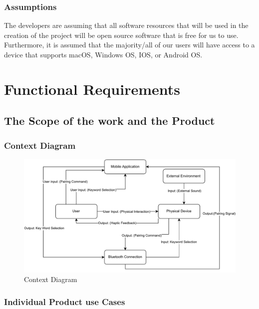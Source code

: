 \documentclass[12pt]{article}
\begin{document}
\subsubsection{Assumptions}
The developers are assuming that all software resources that will be used in the 
creation of the project will be open source software that is free for us to use. 
Furthermore, it is assumed that the majority/all of our users will have access to 
a device that supports macOS, Windows OS, IOS, or Android OS.

\section{Functional Requirements}
\subsection{The Scope of the work and the Product}
\subsubsection{Context Diagram}

\begin{figure}[H]
  \begin{center}
    \includegraphics{WC.pdf}
  \caption{Context Diagram}
  \label{ContextDiagram} 
  \end{center}
\end{figure}

\subsubsection{Individual Product use Cases}
\end{document}
